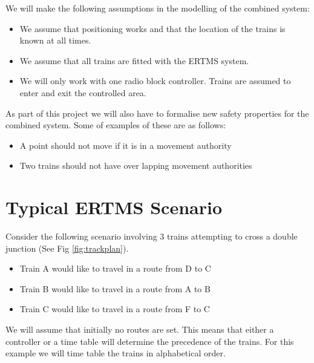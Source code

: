 We will make the following assumptions in the modelling of the combined system:

\begin{itemize}

\item We assume that positioning works and that the location of the trains is known at all times.

\item We assume that all trains are fitted with the ERTMS system.

\item We will only work with one radio block controller. Trains are assumed to enter and exit the controlled area.


\end{itemize}

As part of this project we will also have to formalise new safety properties for the combined system. Some of examples of these are as follows:

\begin{itemize}

\item A point should not move if it is in a movement authority

\item Two trains should not have over lapping movement authorities

\end{itemize}


\section{Typical  ERTMS Scenario}

Consider the following scenario involving 3 trains attempting to cross a double junction (See Fig \ref{fig:trackplan}).

\begin{itemize}
\item Train A would like to travel in a route from D to C
\item Train B would like to travel in a route from A to B
\item Train C would like to travel in a route from F to C
\end{itemize}

We will assume that initially no routes are set. This means that either a controller or a time table will determine the precedence of the trains. For this example we will time table the trains in alphabetical order.



